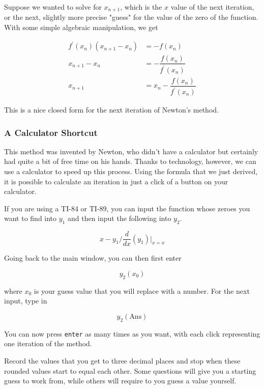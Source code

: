 Suppose we wanted to solve for \( x_{n + 1} \), which is the \( x \) value of the next iteration, or the next, slightly more precise "guess" for the value of the zero of the function. With some simple algebraic manipulation, we get

\begin{align*}
    f^\prime \left( x_n \right) \left( x_{n + 1} - x_n \right) &= - f \left( x_n \right) \\
    x_{n + 1} - x_n &= - \dfrac{f \left( x_n \right)}{f^\prime \left( x_n \right)} \\
    x_{n + 1} &= x_n - \dfrac{f \left( x_n \right)}{f^\prime \left( x_n \right)}
\end{align*}

This is a nice closed form for the next iteration of Newton's method.

\subsubsection{A Calculator Shortcut}

This method was invented by Newton, who didn't have a calculator but certainly had quite a bit of free time on his hands. Thanks to technology, however, we can use a calculator to speed up this process. Using the formula that we just derived, it is possible to calculate an iteration in just a click of a button on your calculator.

If you are using a TI-84 or TI-89, you can input the function whose zeroes you want to find into \( y_1 \) and then input the following into \( y_2 \).

\[ x - y_1 / {\textstyle \frac{d}{dx}} \left( y_1 \right) \vert_{x = x} \]

Going back to the main window, you can then first enter

\[ y_2 \left( x_0 \right) \]

where \( x_0 \) is your guess value that you will replace with a number. For the next input, type in

\[ y_2 \left( \text{Ans} \right) \]

You can now press \verb+enter+ as many times as you want, with each click representing one iteration of the method.

Record the values that you get to three decimal places and stop when these rounded values start to equal each other. Some questions will give you a starting guess to work from, while others will require to you guess a value yourself.

